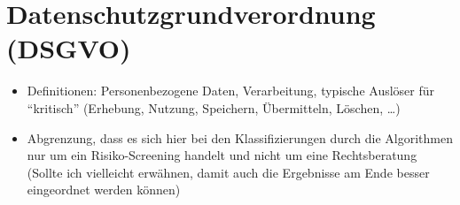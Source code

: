 \section{Datenschutzgrundverordnung (DSGVO)}\label{sec:dsgvo}

\begin{itemize}
    \item Definitionen: Personenbezogene Daten, Verarbeitung, typische Auslöser für ``kritisch'' (Erhebung, Nutzung, Speichern, Übermitteln, Löschen, \ldots)
    \item Abgrenzung, dass es sich hier bei den Klassifizierungen durch die Algorithmen nur um ein Risiko-Screening handelt und nicht um eine Rechtsberatung (Sollte ich vielleicht erwähnen, damit auch die Ergebnisse am Ende besser eingeordnet werden können)
\end{itemize}